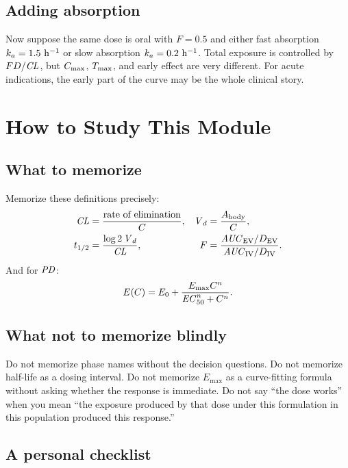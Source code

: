 \documentclass[a4paper]{article}
\renewcommand{\Emax}{\ensuremath{E_{\max}}}
\renewcommand{\ECfifty}{\ensuremath{\pksym{EC}_{50}}}
\newcommand{\CL}{\ensuremath{\pksym{CL}}}
\newcommand{\Vd}{\ensuremath{\pksym{V}_d}}
\newcommand{\AUC}{\ensuremath{\pksym{AUC}}}
\newcommand{\Cmax}{\ensuremath{C_{\pklab{max}}}}
\newcommand{\Tmax}{\ensuremath{T_{\pklab{max}}}}
\newcommand{\ka}{\ensuremath{k_a}}
\newcommand{\Fbio}{\ensuremath{F}}
\newcommand{\PD}{\ensuremath{\pksym{PD}}}
\begin{document}
\subsection{Adding absorption}

Now suppose the same dose is oral with \(\Fbio=0.5\) and either fast absorption \(\ka=1.5\ \pklab{h}^{-1}\) or slow absorption \(\ka=0.2\ \pklab{h}^{-1}\). Total exposure is controlled by \(\Fbio{} D/\CL\), but \(\Cmax\), \(\Tmax\), and early effect are very different. For acute indications, the early part of the curve may be the whole clinical story.

\section{How to Study This Module}

\subsection{What to memorize}

Memorize these definitions precisely:
\[
  \begin{aligned}
    \CL&=\frac{\text{rate of elimination}}{C},
    &
    \Vd&=\frac{A_{\pklab{body}}}{C},\\
    t_{1/2}&=\frac{\log 2\,\Vd}{\CL},
    &
    \Fbio&=\frac{\AUC_{\pklab{EV}}/D_{\pklab{EV}}}{\AUC_{\pklab{IV}}/D_{\pklab{IV}}}.
  \end{aligned}
\]
And for \PD:
\[
  E(C)=E_0+\frac{\Emax{} C^n}{\ECfifty^n+C^n}.
\]

\subsection{What not to memorize blindly}

Do not memorize phase names without the decision questions. Do not memorize half-life as a dosing interval. Do not memorize \(\Emax\) as a curve-fitting formula without asking whether the response is immediate. Do not say ``the dose works'' when you mean ``the exposure produced by that dose under this formulation in this population produced this response.''

\subsection{A personal checklist}
\end{document}
